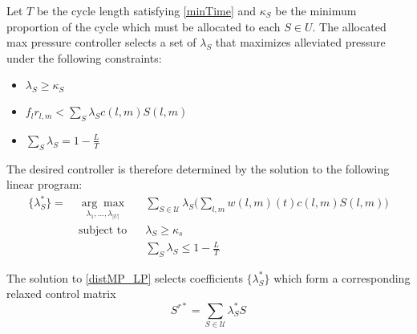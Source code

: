 Let $T$ be the cycle length satisfying \eqref{minTime} and $\kappa_S$ be the minimum proportion of the cycle which must be allocated to each $S\in U$. %
The allocated max pressure controller selects a set of $\lambda_S$ that maximizes alleviated pressure under the following constraints:
\begin{itemize}
\item $\lambda_{S} \geq \kappa_S$ 
\item $f_{l}r_{l,m} < \sum_{S}\lambda_{S} c(l,m)S(l,m)$
\item $ \sum_{S} \lambda_{S} = 1 - \frac{L}{T}$
\end{itemize}
The desired controller is therefore determined by the solution to the following linear program: 
\begin{align} \nonumber
\{ \lambda^*_S \} = \; & \underset{\lambda_{1},...,\lambda_{\vert U\vert}}{ \arg \max} & & \sum_{S \in \mathcal{U}}\lambda_{S}\Big(\sum_{l,m} w(l,m)(t)c(l,m) S(l,m)\Big)  \\
\nonumber & \text{subject to}
\nonumber & &  \lambda_{S} \geq \kappa_s\\
&&&\sum_{S} \lambda_{S} \leq 1 - \tfrac{L}{T}  \label{distMP_LP}
\end{align}



The solution to \eqref{distMP_LP} selects coefficients $\{ \lambda_{S}^{*} \} $ which form a corresponding relaxed control
matrix \begin{equation} S^{r*} = \displaystyle\sum_{S \in \mathcal{U}}\lambda_{S}^{*}S\end{equation}





